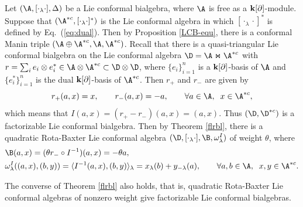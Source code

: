 \documentclass[12pt]{amsart}
\begin{document}
\begin{example} \label{excdd}
Let $(\A,[\cdot_\lambda \cdot],\Delta) $ be a Lie conformal
bialgebra, where $\A$ is free as a ${\bf k}[\partial]$-module.
Suppose that $(\A^{\ast c}, [\cdot_\lambda \cdot]^\ast)$ is the
        Lie conformal algebra in which $[\cdot_\lambda \cdot]^\ast
        $ is defined by Eq.~(\ref{eq:dual}).
Then by Proposition \ref{LCB-equ}, there is a conformal Manin
triple $(\A\oplus \A^{\ast c}, \A, \A^{\ast c})$.  Recall
\cite[Thoerem 3.10]{L} that there is a quasi-triangular Lie
conformal bialgebra on the Lie conformal algebra $\D
=\A\Join\A^{*c}$ with $r=\sum_ie_i\otimes e^*_i\in \A\otimes
\A^{*c}\subset\D\otimes\D$, where $\{e_i\}^n_{i=1}$ is a ${\bf
k}[\partial]$-basis of $\A$ and $\{e^*_i\}^n_{i=1}$ is the dual
${\bf k}[\partial]$-basis of $\A^{*c}$. Then  $r_+$ and $r_-$ are
given by
\begin{equation*}
    r_+(a,x)=x,\qquad r_-(a,x)=-a,\qquad  \forall a\in\A,\;\;x\in\A^{*c},
\end{equation*}
which means that $I(a,x)=(r_+-r_-)(a,x)=(a,x)$. Thus
$(\D,\D^{*c})$ is a factorizable Lie conformal bialgebra.  Then by
Theorem \ref{flrbl}, there is a quadratic
Rota-Baxter Lie conformal algebra
$(\D,[\cdot_\lambda\cdot],\B,\omega^I_\lambda)$ of weight  $\theta$, where
\begin{align*}
    &\B(a,x)=(\theta  r_-\circ I^{-1})(a,x)=-\theta a,\\
    &\omega^I_{\lambda}((a,x),(b,y))=\langle I^{-1}(a,x),(b,y ) \rangle_\lambda=x_\lambda(b)+y_{-\lambda}(a),\qquad \forall a,b\in \A, \;\;x,y\in \A^{*c}.
\end{align*}
\end{example}

The converse of Theorem \ref{flrbl} also holds, that is, quadratic
Rota-Baxter Lie conformal algebras of nonzero weight    give factorizable Lie conformal bialgebras.
\end{document}
